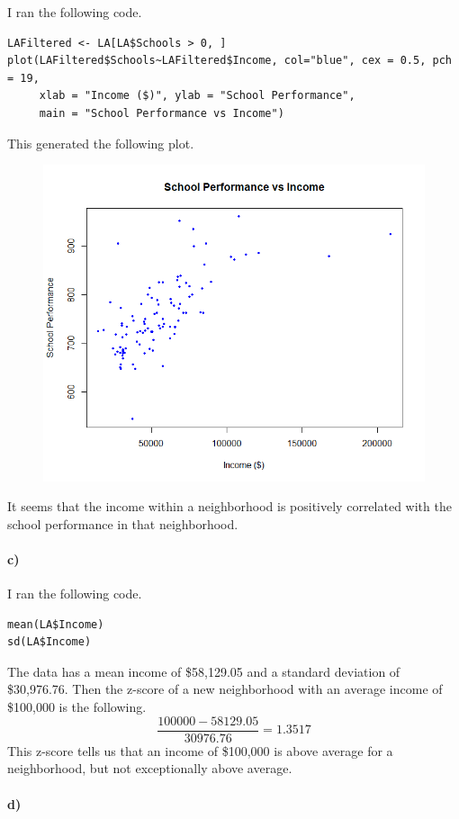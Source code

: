 \documentclass[12pt]{article}
\begin{document}
I ran the following code.
\scriptsize
\begin{verbatim}
LAFiltered <- LA[LA$Schools > 0, ]
plot(LAFiltered$Schools~LAFiltered$Income, col="blue", cex = 0.5, pch = 19,
     xlab = "Income ($)", ylab = "School Performance",
     main = "School Performance vs Income")
\end{verbatim}
\normalsize
This generated the following plot.
\begin{figure}[H]
    \begin{center}
        \includegraphics[width=4.5in]{exercise4b.png}
    \end{center}
\end{figure}
It seems that the income within a neighborhood is positively correlated with the school
performance in that neighborhood.

\paragraph{c)}

I ran the following code.
\begin{verbatim}
mean(LA$Income)
sd(LA$Income)
\end{verbatim}
The data has a mean income of \$58,129.05 and a standard deviation of \$30,976.76. Then the z-score of a new neighborhood
with an average income of \$100,000 is the following.
\[\frac{100000-58129.05}{30976.76}=1.3517\]
This z-score tells us that an income of \$100,000 is above average for a neighborhood, but not exceptionally above average.

\paragraph{d)}
\end{document}
